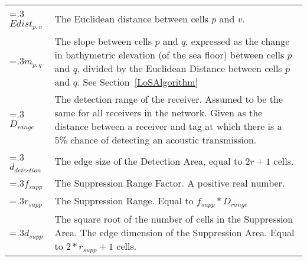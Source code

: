 \noindent\begin{tabularx}{\linewidth}{@{}>{\hsize=.3\hsize}X>{\hsize=1.5\hsize}X@{}}
	$Edist_{p,v}$ & The Euclidean distance between cells $p$ and $v$.\\

	$m_{p,q}$&The slope between cells $p$ and $q$, expressed as the change in bathymetric elevation (of the sea floor) between cells $p$ and $q$, divided by the Euclidean Distance between cells $p$ and $q$. See Section~\ref{LoSAlgorithm}\\
	
	$D_{range}$ & The detection range of the receiver.  Assumed to be the same for all receivers in the network.  Given as the distance between a receiver and tag at which there is a 5\% chance of detecting an acoustic transmission.\\
	
	$d_{detection}$& The edge size of the Detection Area, equal to $2r+1$ cells.\\
	$f_{supp}$ & The Suppression Range Factor.  A positive real number.\\
	$r_{supp}$ & The Suppression Range. Equal to $f_{supp}*D_{range}$\\
	$d_{supp}$ & The square root of the number of cells in the Suppression Area.  The edge dimension of the Suppression Area.  Equal to $2*r_{supp} + 1$ cells.\\
\end{tabularx}
